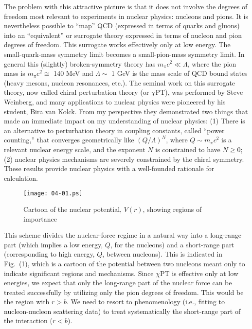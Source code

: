 \documentclass{svmult}
\begin{document}
The problem with this attractive picture is that it does not involve the degrees
of freedom most relevant to experiments in nuclear physics: nucleons and pions.
It is nevertheless possible to ``map'' QCD (expressed in terms of quarks and
gluons) into an ``equivalent'' or surrogate theory expressed in terms of nucleon
and pion degrees of freedom.  This surrogate works effectively only at low
energy.  The small-quark-mass symmetry limit becomes a small-pion-mass symmetry
limit.  In general this (slightly) broken-symmetry theory has $m_{\pi} c^2 \ll
\Lambda$, where the pion mass is $m_{\pi} c^2 \cong$ 140 MeV and $\Lambda \sim$
1 GeV is the mass scale of QCD bound states (heavy mesons, nucleon resonances,
etc.). The seminal work on this surrogate theory, now called chiral perturbation
theory (or $\chi$PT), was performed by Steve
Weinberg\cite{QCD}, and many applications to nuclear physics were pioneered by
his student, Bira van Kolck\cite{nQCD}. From my perspective they demonstrated
two things that made an immediate impact on my understanding of nuclear
physics\cite{pc}: (1) There is an alternative to perturbation theory in coupling
constants, called ``power counting,'' that converges
geometrically like $(Q/\Lambda)^N$, where $Q \sim m_{\pi}c^2$ is a relevant
nuclear energy scale, and the exponent $N$ is constrained to have $N \geq 0$;
(2) nuclear physics mechanisms are severely constrained by the chiral symmetry.
These results provide nuclear physics with a well-founded rationale for
calculation.

\begin{figure}   \centering   
\texttt{[image: 04-01.ps]}   
\caption{Cartoon of the nuclear potential, $V (r)$, showing regions of  
importance}
\end{figure}

This scheme divides the nuclear-force regime in a natural way into a long-range
part (which implies a low energy, $Q$, for the
nucleons) and a short-range part (corresponding
to high energy, $Q$, between nucleons). This is indicated in Fig.~(1), which is
a cartoon of the potential between two nucleons meant only to indicate
significant regions and mechanisms. Since $\chi$PT is effective only at low 
energies, we expect that only the long-range part of the nuclear force can be 
treated successfully by utilizing only the pion degrees of freedom. This would 
be the region with $r > b$. We need to resort to
phenomenology (i.e., fitting to nucleon-nucleon
scattering data) to treat systematically the short-range part of the interaction
($r < b$).
\end{document}
